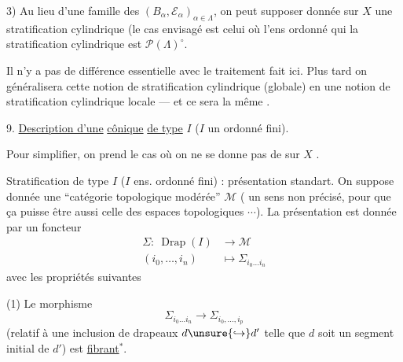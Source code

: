3) Au lieu d'une famille des \((B_\alpha,\mathcal E_\alpha)_{\alpha\in\Lambda}\),
on peut supposer donnée sur \(X\) une
stratification cylindrique  (le cas envisagé
est celui où l'ens ordonné qui 
 la stratification cylindrique est
\(\mathcal P(\Lambda)^\circ\).

Il n'y a pas de différence essentielle avec
le traitement fait ici. Plus tard on
généralisera cette notion de stratification
cylindrique (globale) en une notion de
stratification cylindrique locale --- et ce sera
la même .

9. \uline{Description d'une} 
 \uline{cônique} \uline{de type} \(I\)
(\(I\) un ordonné fini).

Pour simplifier, on prend  le cas où on
ne se donne pas de 
sur \(X\) .



Stratification 
de type \(I\) (\(I\) ens. ordonné fini) : présentation standart.
On suppose donnée une ``catégorie topologique modérée'' \(\mathcal M\)
(  un sens non précisé, pour que ça puisse être aussi celle des
espaces topologiques \(\cdots\)). La présentation est donnée
par un  foncteur
\[
 \begin{aligned}
 \Sigma:\ \operatorname{Drap}(I)&\longrightarrow\mathcal M\\
 (i_0,\ldots,i_n)&\longmapsto\Sigma_{i_0\ldots i_n}
 \end{aligned}
\]
avec les propriétés suivantes

(1) Le  morphisme
\[
 \Sigma_{i_0\ldots i_n}\longrightarrow\Sigma_{i_0,\ldots,i_p}
\]
(relatif à une inclusion de drapeaux
\(d\unsure{\hookrightarrow}d'\) telle
que \(d\) soit un segment initial de \(d'\)) est \uline{fibrant}\(^*\).



